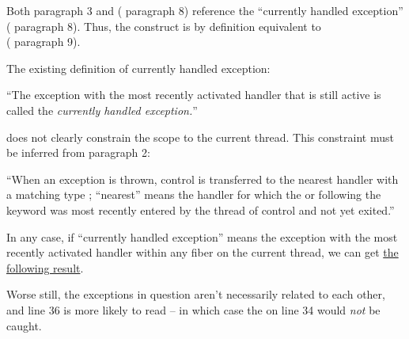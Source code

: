 \newpage
{}\label{throw}

Both  paragraph 3 and 
( paragraph 8) reference the ``currently handled
exception'' ( paragraph 8). Thus, the
construct  is by definition equivalent to\\
( paragraph 9).

The existing definition of currently handled exception:

``The exception with the most recently activated handler that is still active
is called the \emph{currently handled exception.}''

does not clearly constrain the scope to the current thread. This constraint
must be inferred from  paragraph 2:

``When an exception is thrown, control is transferred to the nearest handler
with a matching type ; ``nearest'' means the handler for
which the  or
 following the  keyword was
most recently entered by the thread of control and not yet exited.''

In any case, if ``currently handled exception'' means the exception with the
most recently activated handler within any fiber on the current thread, we can get
\href{https://github.com/secondlife/3p-boost/blob/nat/exstate/tests/nullary_throw.cpp}{the following result}.


Worse still, the exceptions in question aren't necessarily related to each
other, and line 36 is more likely to read  --
in which case the  on line 34 would \emph{not} be caught.

